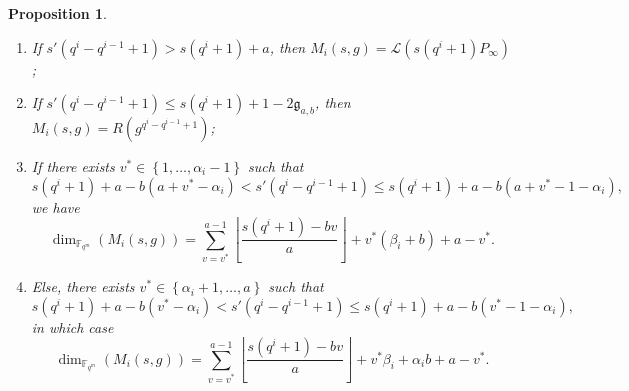 \documentclass[a4paper]{article}
\newtheorem{proposition}[thm]{Proposition}
\theoremstyle{definition}
\theoremstyle{remark}
\newcommand{\calL}{\mathcal{L}}
\newcommand{\fqm}{\mathbb{F}_{q^m}}
\newcommand{\set}[1]{\left\{#1\right\}}
\begin{document}
\begin{proposition} \label{prop:dim_M_i's}
    \begin{enumerate}
        \item If $s'(q^i-q^{i-1}+1) > s(q^i+1)+a$, then $M_i(s,g) = \calL(s(q^i+1)P_\infty)$ ;
        
        \item If $s'(q^i-q^{i-1}+1) \leq s(q^i+1)+1-2\mathfrak{g}_{a,b}$, then $M_i(s,g) = R(g^{q^{i}-q^{i-1}+1})$;
        
        \item If there exists $v^* \in \set{1,\dots,\alpha_i-1}$ such that
        $$ s(q^i+1)+a-b(a+v^*-\alpha_i) < s'(q^i-q^{i-1}+1) \leq  s(q^i+1)+a-b(a+v^*-1-\alpha_i),$$
        we have 
          $$\dim_{\fqm}(M_i(s,g)) = \sum\limits_{v=v^*}^{a-1} \left\lfloor \dfrac{s(q^i+1)-bv}{a} \right\rfloor + v^*(\beta_i+b) + a-v^*.$$
        
        \item Else, there exists $v^* \in \set{\alpha_i+1,\dots,a}$ such that
        $$ s(q^i+1)+a-b(v^*-\alpha_i) < s'(q^i-q^{i-1}+1) \leq  s(q^i+1)+a-b(v^*-1-\alpha_i),$$
        in which case 
        $$\dim_{\fqm}(M_i(s,g)) = \sum\limits_{v=v^*}^{a-1} \left\lfloor \dfrac{s(q^i+1)-bv}{a} \right\rfloor + v^*\beta_i + \alpha_ib +a-v^*.$$
    \end{enumerate}
\end{proposition}
\end{document}

